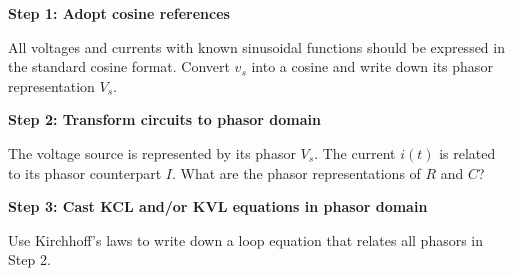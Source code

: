 \begin{enumerate}

\qitem \textbf{Step 1: Adopt cosine references}

All voltages and currents with known sinusoidal functions
should be expressed in the standard cosine format.
Convert $v_s$ into a cosine and write down its phasor representation $V_s$.




\qitem \textbf{Step 2: Transform circuits to phasor domain}

The voltage source is represented by its phasor $V_s$.
The current $i(t)$ is related to its phasor counterpart $I$. 
What are the phasor representations of $R$ and $C$?



\qitem \textbf{Step 3: Cast KCL and/or KVL equations in phasor domain}

Use Kirchhoff's laws to write down a loop equation that relates all phasors in Step 2. 



\end{enumerate}
